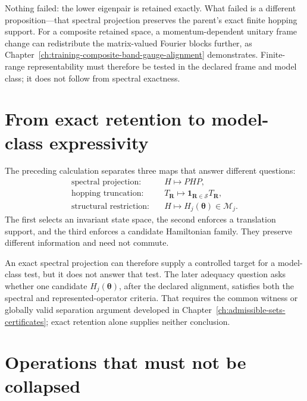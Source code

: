 Nothing failed: the lower eigenpair is retained exactly. What failed is a
different proposition---that spectral projection preserves the parent's exact
finite hopping support. For a composite retained space, a momentum-dependent
unitary frame change can redistribute the matrix-valued Fourier blocks further,
as Chapter~\ref{ch:training-composite-band-gauge-alignment} demonstrates.
Finite-range representability must therefore be tested in the declared frame
and model class; it does not follow from spectral exactness.

\section{From exact retention to model-class expressivity}

The preceding calculation separates three maps that answer different
questions:
\begin{align}
  \text{spectral projection:}
  &\quad H\longmapsto PHP,\\
  \text{hopping truncation:}
  &\quad T_{\mathbf R}\longmapsto
    \mathbf 1_{\mathbf R\in\mathcal S}T_{\mathbf R},\\
  \text{structural restriction:}
  &\quad H\longmapsto H_j(\boldsymbol\theta)\in\mathcal M_j.
\end{align}
The first selects an invariant state space, the second enforces a translation
support, and the third enforces a candidate Hamiltonian family. They preserve
different information and need not commute.

An exact spectral projection can therefore supply a controlled target for a
model-class test, but it does not answer that test. The later adequacy question
asks whether one candidate \(H_j(\boldsymbol\theta)\), after the declared
alignment, satisfies both the spectral and represented-operator criteria. That
requires the common witness or globally valid separation argument developed in
Chapter~\ref{ch:admissible-sets-certificates}; exact retention alone supplies
neither conclusion.

\section{Operations that must not be collapsed}

